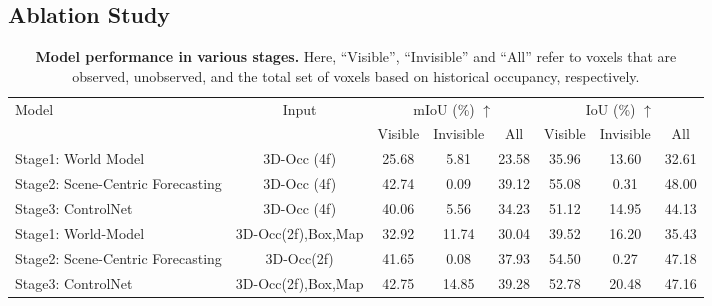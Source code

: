 \subsection{Ablation Study}\label{sec:exp_ab}


\begin{table}[t]
    \newcommand{\graycell}{\cellcolor{gray!30}}
    \setlength{\tabcolsep}{0.006\linewidth}
    \caption{
        \textbf{Model performance in various stages.}
        Here, ``Visible'', ``Invisible'' and ``All'' refer to voxels that are observed, unobserved, and the total set of voxels based on historical occupancy, respectively.
    }
    \label{tab:ablate_stages}
    \centering
    \small
    \begin{tabular}{l|c|ccc|ccc}
        \toprule
        \multirow{2}{*}{Model}   & \multirow{2}{*}{Input} & 
        \multicolumn{3}{c|}{mIoU (\%) $\uparrow$} & 
        \multicolumn{3}{c}{IoU (\%) $\uparrow$} \\
        & &  Visible & Invisible & All &  Visible & Invisible & All \\
        \midrule
        Stage1: World Model  & 3D-Occ (4f)     & 25.68 & 5.81 & 23.58  & 35.96 & 13.60 & 32.61 \\        
        Stage2: Scene-Centric Forecasting  & 3D-Occ (4f)       &  42.74 & 0.09 & 39.12  & 55.08 & 0.31  & 48.00 \\
        Stage3: ControlNet  & 3D-Occ (4f) & 40.06 & 5.56 & 34.23  & 51.12 & 14.95 & 44.13 \\\midrule
        Stage1: World-Model &   3D-Occ(2f),Box,Map    & 32.92 & 11.74 & 30.04  & 39.52 & 16.20 & 35.43 \\        
        Stage2: Scene-Centric Forecasting &  3D-Occ(2f)    &   41.65    &  0.08 & 37.93  & 54.50 &  0.27 & 47.18 \\
        Stage3: ControlNet  &  3D-Occ(2f),Box,Map & 42.75 & 14.85 & 39.28 & 52.78 & 20.48 &  47.16 \\
        \bottomrule
    \end{tabular}
\end{table}

